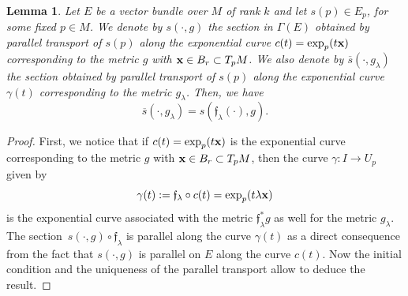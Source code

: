 \documentclass[pdftex]{sigma}
\numberwithin{equation}{section}
\newtheorem{lem}[thm]{Lemma}
\theoremstyle{definition}
\begin{document}
\begin{lem} \label{ref:eq:patrgglambda} Let $E$ be a vector bundle over $M$ of rank $k$ and let $s(p)\in E_p$, for some fixed $p\in M$. We denote by $s(\cdot,g)$ the section in $\Gamma(E)$ obtained by parallel transport of $s(p)$ along the exponential curve $c(t)={\rm exp}_p(t{\bf x})$ corresponding to the metric $g$ with ${\bf x}\in B_r\subset T_pM$. We also denote by $\overline{s}(\cdot,g_\lambda)$ the section obtained by parallel transport of $s(p)$ along the exponential curve~$\gamma(t)$ corresponding to the metric $g_\lambda$. Then, we have
\[\overline{s}(\cdot,g_\lambda)=s(\mathfrak{f}_\lambda(\cdot),g).\]
\end{lem}
\begin{proof}
First, we notice that if $c(t)={\rm exp}_p(t{\bf x})$ is the exponential curve corresponding to the metric $g$ with ${\bf x}\in B_r\subset T_pM$, then the curve $\gamma\colon I\to U_p$ given by
\[\gamma(t):=\mathfrak{f}_\lambda\circ c(t)={\rm exp}_p(t\lambda{\bf x})\] is the exponential curve associated with the metric $\mathfrak{f}_\lambda^*g$ as well for the metric $g_\lambda$.
The section~$s(\cdot,g)\circ\mathfrak{f}_\lambda$ is parallel along the curve $\gamma(t)$ as a direct consequence from the fact that $s(\cdot,g)$ is parallel on $E$ along the curve $c(t)$. Now the initial condition and the uniqueness of the parallel transport allow to deduce the result.
\end{proof}
\end{document}
